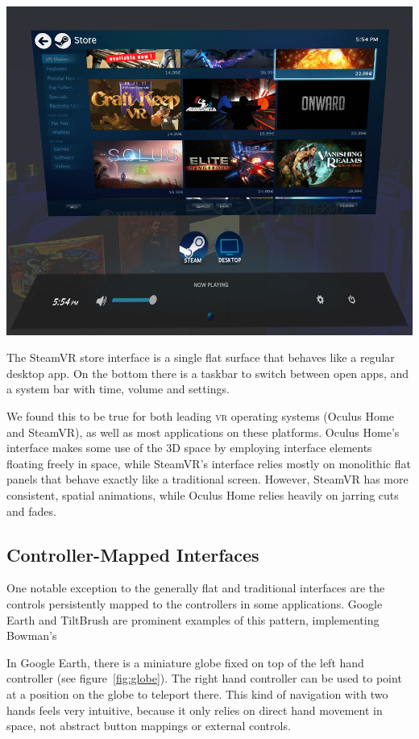 \documentclass{tufte-book} %
\begin{document}
\begin{marginfigure}
  \includegraphics[width=\linewidth]{steamstore.png}
  \caption{The SteamVR store interface is a single flat surface that behaves like a regular desktop app. On the bottom there is a taskbar to switch between open apps, and a system bar with time, volume and settings.}
  \label{fig:steamstore}
\end{marginfigure}

We found this to be true for both leading \textsc{vr} operating systems (Oculus Home and SteamVR), as well as most applications on these platforms. Oculus Home's interface makes some use of the 3D space by employing interface elements floating freely in space, while SteamVR's interface relies mostly on monolithic flat panels that behave exactly like a traditional screen. However, SteamVR has more consistent, spatial animations, while Oculus Home relies heavily on jarring cuts and fades.


\subsection{Controller-Mapped Interfaces}
One notable exception to the generally flat and traditional interfaces are the controls persistently mapped to the controllers in some applications. Google Earth and TiltBrush are prominent examples of this pattern, implementing Bowman's

In Google Earth, there is a miniature globe fixed on top of the left hand controller (see figure~\ref{fig:globe}). The right hand controller can be used to point at a position on the globe to teleport there. This kind of navigation with two hands feels very intuitive, because it only relies on direct hand movement in space, not abstract button mappings or external controls.
\end{document}

